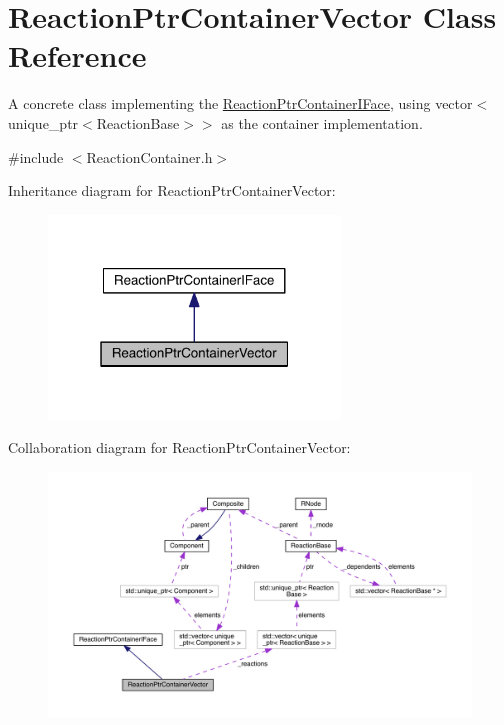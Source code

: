 \hypertarget{classReactionPtrContainerVector}{\section{Reaction\+Ptr\+Container\+Vector Class Reference}
\label{classReactionPtrContainerVector}
}


A concrete class implementing the \hyperlink{classReactionPtrContainerIFace}{Reaction\+Ptr\+Container\+I\+Face}, using vector$<$unique\+\_\+ptr$<$\+Reaction\+Base$>$$>$ as the container implementation.  




{\ttfamily \#include $<$Reaction\+Container.\+h$>$}



Inheritance diagram for Reaction\+Ptr\+Container\+Vector\+:\nopagebreak
\begin{figure}[H]
\begin{center}
\leavevmode
\includegraphics[width=220pt]{classReactionPtrContainerVector__inherit__graph}
\end{center}
\end{figure}


Collaboration diagram for Reaction\+Ptr\+Container\+Vector\+:
\nopagebreak
\begin{figure}[H]
\begin{center}
\leavevmode
\includegraphics[width=350pt]{classReactionPtrContainerVector__coll__graph}
\end{center}
\end{figure}
